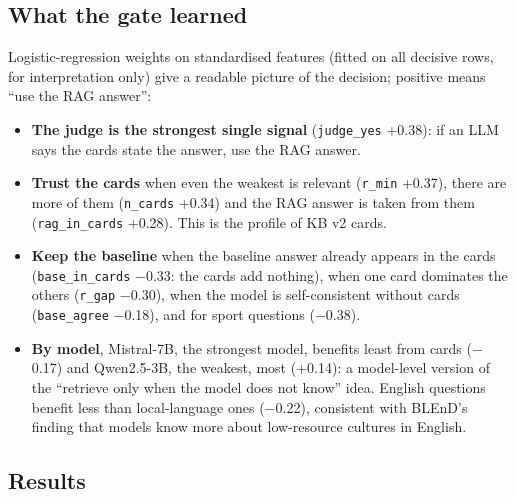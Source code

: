 \documentclass[11pt]{article}
\begin{document}
\subsection{What the gate learned}
Logistic-regression weights on standardised features (fitted on all decisive rows, for
interpretation only) give a readable picture of the decision; positive means ``use the RAG answer'':
\begin{itemize}
\item \textbf{The judge is the strongest single signal} (\texttt{judge\_yes} +0.38): if an LLM says
the cards state the answer, use the RAG answer.
\item \textbf{Trust the cards} when even the weakest is relevant (\texttt{r\_min} +0.37), there are
more of them (\texttt{n\_cards} +0.34) and the RAG answer is taken from them (\texttt{rag\_in\_cards}
+0.28). This is the profile of KB v2 cards.
\item \textbf{Keep the baseline} when the baseline answer already appears in the cards
(\texttt{base\_in\_cards} $-$0.33: the cards add nothing), when one card dominates the others
(\texttt{r\_gap} $-$0.30), when the model is self-consistent without cards (\texttt{base\_agree}
$-$0.18), and for sport questions ($-$0.38).
\item \textbf{By model}, Mistral-7B, the strongest model, benefits least from cards ($-$0.17) and
Qwen2.5-3B, the weakest, most (+0.14): a model-level version of the ``retrieve only when the model
does not know'' idea. English questions benefit less than local-language ones ($-$0.22), consistent
with BLEnD's finding that models know more about low-resource cultures in English.
\end{itemize}

\subsection{Results}
\end{document}
